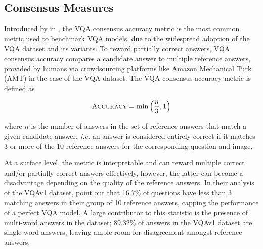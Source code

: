 


\subsection{Consensus Measures}

Introduced by \citeauthor{antol2015vqa} in \citeyear{antol2015vqa}, the VQA consensus accuracy metric is the most common metric used to benchmark VQA models, due to the widespread adoption of the VQA dataset and its variants. To reward partially correct answers, VQA consensus accuracy compares a candidate answer to multiple reference answers, provided by humans via crowdsourcing platforms like Amazon Mechanical Turk (AMT) in the case of the VQA dataset. The VQA consensus accuracy metric is defined as

\begin{equation}
    \textsc{Accuracy} = \min \left( \frac{n}{3}, 1 \right)
    \label{eq:vqa_consensus_accuracy}
\end{equation}

where \(n\) is the number of answers in the set of reference answers that match a given candidate answer, \textit{i.e.} an answer is considered entirely correct if it matches 3 or more of the 10 reference answers for the corresponding question and image.

At a surface level, the metric is interpretable and can reward multiple correct and/or partially correct answers effectively, however, the latter can become a disadvantage depending on the quality of the reference answers. In their analysis of the VQAv1 dataset, \citeauthor{kafle2017visual} point out that 16.7\% of questions have less than 3 matching answers in their group of 10 reference answers, capping the performance of a perfect VQA model. A large contributor to this statistic is the presence of multi-word answers in the dataset; 89.32\% of answers in the VQAv1 dataset are single-word answers, leaving ample room for disagreement amongst reference answers.


